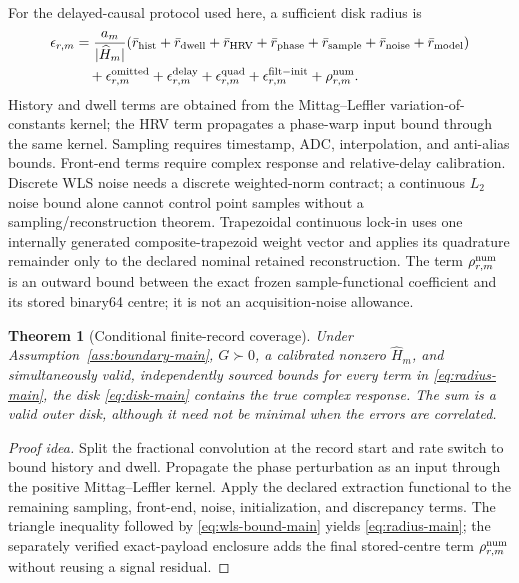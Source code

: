 \documentclass[11pt]{article}
\newtheorem{theorem}{Theorem}[section]
\theoremstyle{definition}
\theoremstyle{remark}
\begin{document}
For the delayed-causal protocol used here, a sufficient disk radius is
\begin{align}
 \epsilon_{r,m}
 &=\frac{a_m}{|\widehat H_m|}
 (\bar r_{\rm hist}+\bar r_{\rm dwell}+\bar r_{\rm HRV}
 +\bar r_{\rm phase}+\bar r_{\rm sample}
 +\bar r_{\rm noise}+\bar r_{\rm model}) \notag\\
 &\quad+\epsilon^{\rm omitted}_{r,m}
 +\epsilon^{\rm delay}_{r,m}
 +\epsilon^{\rm quad}_{r,m}
 +\epsilon^{\rm filt-init}_{r,m}
 +\rho^{\rm num}_{r,m}.
 \label{eq:radius-main}
\end{align}
History and dwell terms are obtained from the Mittag--Leffler variation-of-
constants kernel; the HRV term propagates a phase-warp input bound through the
same kernel.  Sampling requires timestamp, ADC, interpolation, and anti-alias
bounds.  Front-end terms require complex response and relative-delay
calibration.  Discrete WLS noise needs a discrete weighted-norm contract; a
continuous $L_2$ noise bound alone cannot control point samples without a
sampling/reconstruction theorem.  Trapezoidal continuous lock-in uses one
internally generated composite-trapezoid weight vector and applies its
quadrature remainder only to the declared nominal retained reconstruction.
The term $\rho^{\rm num}_{r,m}$ is an outward bound between the exact frozen
sample-functional coefficient and its stored binary64 centre; it is not an
acquisition-noise allowance.

\begin{theorem}[Conditional finite-record coverage]
\label{thm:r2-main}
Under Assumption~\ref{ass:boundary-main}, $G\succ0$, a calibrated nonzero
$\widehat H_m$, and simultaneously valid, independently sourced bounds for
every term in
\eqref{eq:radius-main}, the disk \eqref{eq:disk-main} contains the true complex
response.  The sum is a valid outer disk, although it need not be minimal when
the errors are correlated.
\end{theorem}

\begin{proof}[Proof idea]
Split the fractional convolution at the record start and rate switch to bound
history and dwell.  Propagate the phase perturbation as an input through the
positive Mittag--Leffler kernel.  Apply the declared extraction functional to
the remaining sampling, front-end, noise, initialization, and discrepancy
terms.  The triangle inequality followed by \eqref{eq:wls-bound-main} yields
\eqref{eq:radius-main}; the separately verified exact-payload enclosure adds
the final stored-centre term $\rho^{\rm num}_{r,m}$ without reusing a signal
residual.
\end{proof}
\end{document}
